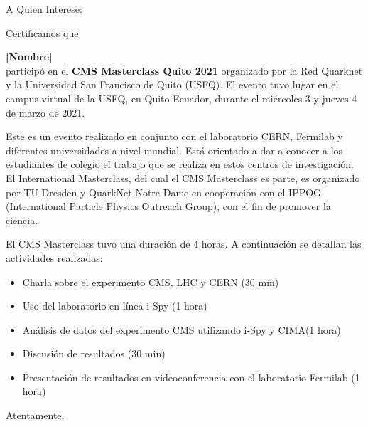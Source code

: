 \documentclass{letter}[14pt]
\date{Quito, 5 de marzo 2021}
\begin{document}

\begin{letter}{A Quien Interese:}

\opening{\vspace{0.5cm}Certificamos que\\}

{\centering \Large \bf [Nombre]\\}
\vspace{0.5cm}
participó en el {\bf CMS Masterclass Quito 2021} organizado por la Red Quarknet y la Universidad San Francisco de Quito (USFQ).  El evento
tuvo lugar en el campus virtual de la USFQ, en Quito-Ecuador,
durante el miércoles 3 y jueves 4 de marzo de 2021.

Este es un evento realizado en conjunto con el laboratorio CERN, Fermilab y diferentes
universidades a nivel mundial.  Está orientado a dar a conocer a los
estudiantes de colegio el trabajo que se realiza en estos centros de investigación. El
International Masterclass, del cual el CMS Masterclass es parte, es organizado por TU Dresden y QuarkNet Notre Dame en
cooperación con el IPPOG (International Particle Physics Outreach Group), con el fin de promover la ciencia.

El CMS Masterclass tuvo una duración de 4 horas.  A continuación se detallan
las actividades realizadas:

\begin{itemize}
\item Charla sobre el experimento CMS, LHC y CERN (30 min)
\item Uso del laboratorio en línea i-Spy (1 hora)
\item Análisis de datos del experimento CMS utilizando i-Spy y CIMA(1 hora)
\item Discusión de resultados (30 min)
\item Presentación de resultados en videoconferencia con el laboratorio Fermilab (1 hora)
\end{itemize}



\closing{Atentamente,}
\end{letter}
\end{document}
